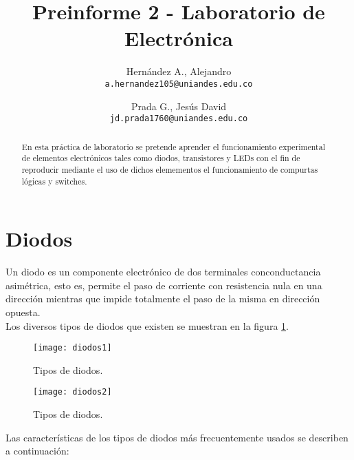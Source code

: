 \documentclass{scrartcl}
\title{Preinforme 2 - Laboratorio de Electrónica}
\author{
	\footnotesize Hernández A., Alejandro\\
	\footnotesize \texttt{a.hernandez105@uniandes.edu.co}
	\and
	\footnotesize Prada G., Jesús David\\
	\footnotesize \texttt{jd.prada1760@uniandes.edu.co}
       }
\date{\vspace{-5ex}}
\begin{document}
\maketitle

\begin{abstract}
\small
En esta práctica de laboratorio se pretende aprender el funcionamiento experimental de elementos electrónicos tales como diodos, transistores y LEDs con el fin de reproducir mediante el uso de dichos elemementos el funcionamiento de compurtas lógicas y switches.
\end{abstract}

\section{Diodos}

Un diodo es un componente electrónico de dos terminales conconductancia asimétrica, esto es, permite el paso de corriente con resistencia nula en una dirección mientras que impide totalmente el paso de la misma en dirección opuesta.\\

Los diversos tipos de diodos que existen se muestran en la figura \ref{fig: diodos1}.

\begin{figure}[h!]
	\centering
	\texttt{[image: diodos1]}
	\caption{Tipos de diodos.}
	\label{fig: diodos1}
\end{figure}

\begin{figure}[h!]
	\centering
	\texttt{[image: diodos2]}
	\caption{Tipos de diodos.}
	\label{fig: diodos2}
\end{figure}

Las características de los tipos de diodos más frecuentemente usados se describen a continuación:
\end{document}
